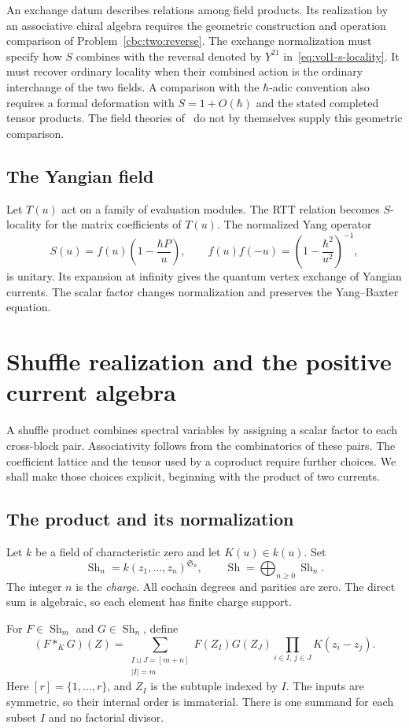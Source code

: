 An exchange datum describes relations among field products.
Its realization by an associative chiral algebra requires the geometric construction and operation comparison of Problem~\ref{cbc:two:reverse}.
The exchange normalization must specify how $S$ combines with the reversal denoted by $Y^{21}$ in~\eqref{eq:vol1-s-locality}.
It must recover ordinary locality when their combined action is the ordinary interchange of the two fields.
A comparison with the $\hbar$-adic convention also requires a formal deformation with $S=1+O(\hbar)$ and the stated completed tensor products.
The field theories of~\cite{LiNonlocal,LiQVA} do not by themselves supply this geometric comparison.

\section{The Yangian field}
Let $T(u)$ act on a family of evaluation modules.  The RTT relation becomes $S$-locality for the matrix coefficients of $T(u)$.  The normalized Yang operator
\[
 S(u)=f(u)\left(1-\frac{\hbar P}{u}\right),
 \qquad
 f(u)f(-u)=\left(1-\frac{\hbar^2}{u^2}\right)^{-1},
\]
is unitary.  Its expansion at infinity gives the quantum vertex exchange of Yangian currents.  The scalar factor changes normalization and preserves the Yang--Baxter equation.

\chapter{Shuffle realization and the positive current algebra}
A shuffle product combines spectral variables by assigning
a scalar factor to each cross-block pair.
Associativity follows from the combinatorics of these pairs.
The coefficient lattice and the tensor used by a coproduct require
further choices.  We shall make those choices explicit, beginning
with the product of two currents.

\section{The product and its normalization}
Let $k$ be a field of characteristic zero and let $K(u)\in k(u)$.
Set
\[
 \operatorname{Sh}_n=k(z_1,\ldots,z_n)^{\mathfrak S_n},
 \qquad \operatorname{Sh}=\bigoplus_{n\geq0}\operatorname{Sh}_n.
\]
The integer $n$ is the \emph{charge}.  All cochain degrees and parities
are zero.  The direct sum is algebraic, so each element has finite
charge support.

For $F\in\operatorname{Sh}_m$ and
$G\in\operatorname{Sh}_n$, define
\begin{equation}\label{eq:vol1-shuffle}
 (F*_KG)(Z)=
 \sum_{\substack{I\sqcup J=[m+n]\\|I|=m}}
 F(Z_I)G(Z_J)\prod_{i\in I,\,j\in J}K(z_i-z_j).
\end{equation}
Here $[r]=\{1,\ldots,r\}$, and $Z_I$ is the subtuple indexed by $I$.
The inputs are symmetric, so their internal order is immaterial.
There is one summand for each subset $I$ and no factorial divisor.

